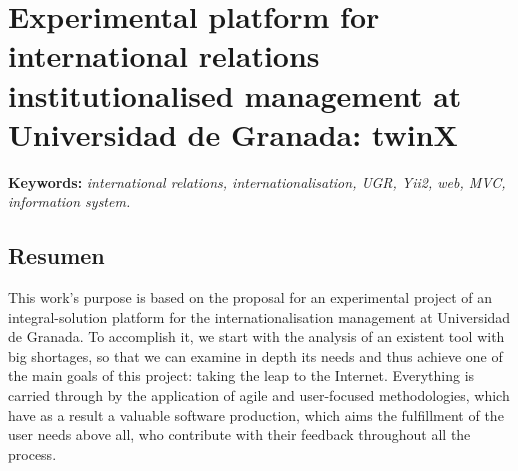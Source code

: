 \chapter*{Experimental platform for international relations institutionalised management at Universidad de Granada: twinX}


\textbf{Keywords:} \textit{international relations, internationalisation, UGR, Yii2, web, MVC, information system.}

\section*{Resumen}

\noindent This work's purpose is based on the proposal for an experimental project of an integral-solution platform for the internationalisation management at Universidad de Granada. To accomplish it, we start with the analysis of an existent tool with big shortages, so that we can examine in depth its needs and thus achieve one of the main goals of this project: taking the leap to the Internet. Everything is carried through by the application of agile and user-focused methodologies, which have as a result a valuable software production, which aims the fulfillment of the user needs above all, who contribute with their feedback throughout all the process.